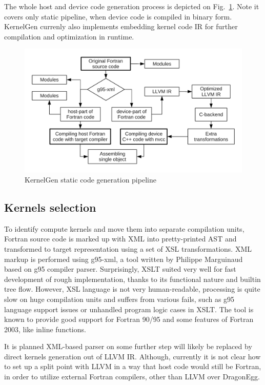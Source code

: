 \documentclass[a4,12pt]{article}
\begin{document}
The whole host and device code generation process is depicted on Fig.~\ref{fig:pipeline}. Note it covers only static pipeline, when device code is compiled in binary form. KernelGen currenly also implements embedding kernel code IR for further compilation and optimization in runtime.

\begin{figure}
\centering
\includegraphics[scale=0.5]{figures/pipeline.pdf}
\caption{KernelGen static code generation pipeline}
\label{fig:pipeline}
\end{figure}

\subsection{Kernels selection}

To identify compute kernels and move them into separate compilation units, Fortran source code is marked up with XML into pretty-printed AST and transformed to target representation using a set of XSL transformations. XML markup is performed using g95-xml, a tool written by Philippe Marguinaud based on g95 compiler parser. Surprisingly, XSLT suited very well for fast development of rough implementation, thanks to its functional nature and builtin tree flow. However, XSL language is not very human-readable, processing is quite slow on huge compilation units and suffers from various fails, such as g95 language support issues or unhandled program logic cases in XSLT. The tool is known to provide good support for Fortran 90/95 and some features of Fortran 2003, like inline functions.

It is planned XML-based parser on some further step will likely be replaced by direct kernels generation out of LLVM IR. Although, currently it is not clear how to set up a split point with LLVM in a way that host code would still be Fortran, in order to utilize external Fortran compilers, other than LLVM over DragonEgg.
\end{document}
